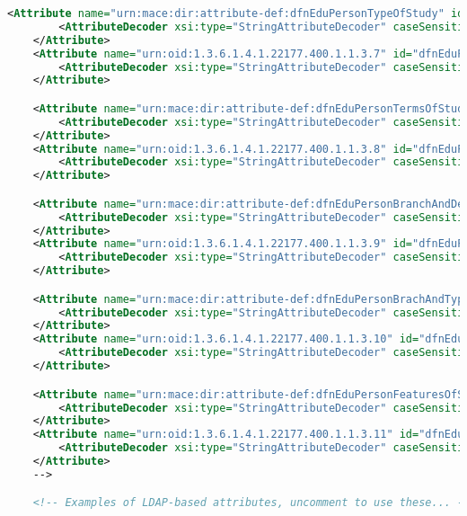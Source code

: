 \begin{lstlisting}[language=xml]
    <Attribute name="urn:mace:dir:attribute-def:dfnEduPersonTypeOfStudy" id="dfnEduPersonTypeOfStudy">
        <AttributeDecoder xsi:type="StringAttributeDecoder" caseSensitive="false"/>
    </Attribute>
    <Attribute name="urn:oid:1.3.6.1.4.1.22177.400.1.1.3.7" id="dfnEduPersonTypeOfStudy">
        <AttributeDecoder xsi:type="StringAttributeDecoder" caseSensitive="false"/>
    </Attribute>

    <Attribute name="urn:mace:dir:attribute-def:dfnEduPersonTermsOfStudy" id="dfnEduPersonTermsOfStudy">
        <AttributeDecoder xsi:type="StringAttributeDecoder" caseSensitive="false"/>
    </Attribute>
    <Attribute name="urn:oid:1.3.6.1.4.1.22177.400.1.1.3.8" id="dfnEduPersonTermsOfStudy">
        <AttributeDecoder xsi:type="StringAttributeDecoder" caseSensitive="false"/>
    </Attribute>

    <Attribute name="urn:mace:dir:attribute-def:dfnEduPersonBranchAndDegree" id="dfnEduPersonBranchAndDegree">
        <AttributeDecoder xsi:type="StringAttributeDecoder" caseSensitive="false"/>
    </Attribute>
    <Attribute name="urn:oid:1.3.6.1.4.1.22177.400.1.1.3.9" id="dfnEduPersonBranchAndDegree">
        <AttributeDecoder xsi:type="StringAttributeDecoder" caseSensitive="false"/>
    </Attribute>

    <Attribute name="urn:mace:dir:attribute-def:dfnEduPersonBrachAndType" id="dfnEduPersonBrachAndType">
        <AttributeDecoder xsi:type="StringAttributeDecoder" caseSensitive="false"/>
    </Attribute>
    <Attribute name="urn:oid:1.3.6.1.4.1.22177.400.1.1.3.10" id="dfnEduPersonBrachAndType">
        <AttributeDecoder xsi:type="StringAttributeDecoder" caseSensitive="false"/>
    </Attribute>

    <Attribute name="urn:mace:dir:attribute-def:dfnEduPersonFeaturesOfStudy" id="dfnEduPersonFeaturesOfStudy">
        <AttributeDecoder xsi:type="StringAttributeDecoder" caseSensitive="false"/>
    </Attribute>
    <Attribute name="urn:oid:1.3.6.1.4.1.22177.400.1.1.3.11" id="dfnEduPersonFeaturesOfStudy">
        <AttributeDecoder xsi:type="StringAttributeDecoder" caseSensitive="false"/>
    </Attribute>
    -->

    <!-- Examples of LDAP-based attributes, uncomment to use these... -->
    

\end{lstlisting}
